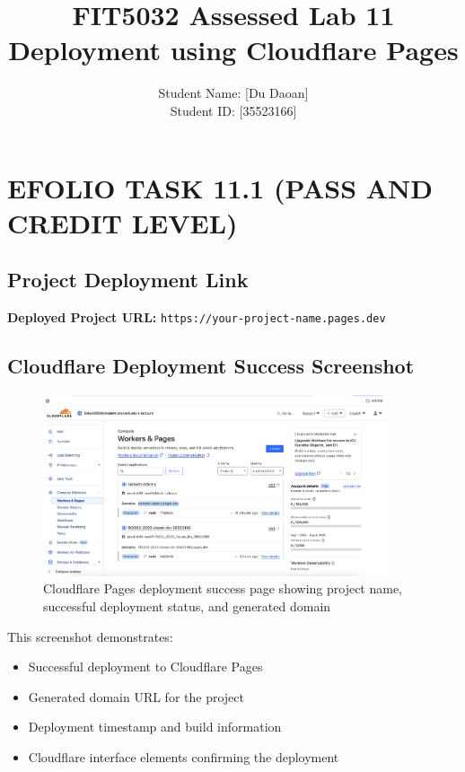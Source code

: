 \documentclass[12pt,a4paper]{article}
\title{FIT5032 Assessed Lab 11\\
Deployment using Cloudflare Pages}
\author{Student Name: [Du Daoan]\\
Student ID: [35523166]}
\date{}
\begin{document}
\maketitle

\tableofcontents
\newpage

\section{EFOLIO TASK 11.1 (PASS AND CREDIT LEVEL)}

\subsection{Project Deployment Link}

\textbf{Deployed Project URL:} \texttt{https://your-project-name.pages.dev}

\subsection{Cloudflare Deployment Success Screenshot}

\begin{figure}[H]
\centering
\includegraphics[width=0.9\textwidth]{cloudflare_deployment_success.png}
\caption{Cloudflare Pages deployment success page showing project name, successful deployment status, and generated domain}
\end{figure}

This screenshot demonstrates:
\begin{itemize}
\item Successful deployment to Cloudflare Pages
\item Generated domain URL for the project
\item Deployment timestamp and build information
\item Cloudflare interface elements confirming the deployment
\end{itemize}
\end{document}
